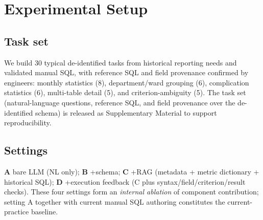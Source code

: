\documentclass[11pt]{article}
\begin{document}
\section{Experimental Setup}
\subsection{Task set}
We build 30 typical de-identified tasks from historical reporting needs and validated manual SQL,
with reference SQL and field provenance confirmed by engineers: monthly statistics (8),
department/ward grouping (6), complication statistics (6), multi-table detail (5), and
criterion-ambiguity (5). The task set (natural-language questions, reference SQL, and field
provenance over the de-identified schema) is released as Supplementary Material to support
reproducibility. %

\subsection{Settings}
\textbf{A} bare LLM (NL only); \textbf{B} +schema; \textbf{C} +RAG (metadata + metric dictionary +
historical SQL); \textbf{D} +execution feedback (C plus syntax/field/criterion/result checks).
These four settings form an \emph{internal ablation} of component contribution; setting A together
with current manual SQL authoring constitutes the current-practice baseline.
\end{document}
